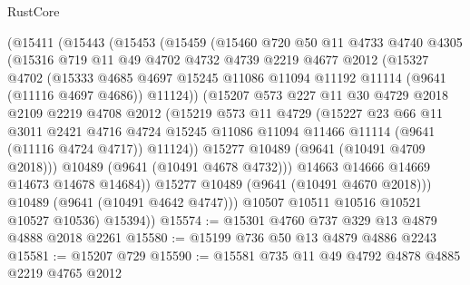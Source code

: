 \begin{lexlean}{RustCore}
\begin{coremodule}
        (@15411
          (@15443
            (@15453
              (@15459
                (@15460
                  @720
                  @50
                  @11
                  @4733
                  @4740
                  @4305
                  (@15316
                    @719
                    @11
                    @49
                    @4702
                    @4732
                    @4739
                    @2219
                    @4677
                    @2012
                    (@15327
                      @4702
                      (@15333
                        @4685
                        @4697
                        @15245
                        @11086
                        @11094
                        @11192
                        @11114
                        (@9641 (@11116 @4697 @4686))
                        @11124))
                    (@15207
                      @573
                      @227
                      @11
                      @30
                      @4729
                      @2018
                      @2109
                      @2219
                      @4708
                      @2012
                      (@15219
                        @573
                        @11
                        @4729
                        (@15227
                          @23
                          @66
                          @11
                          @3011
                          @2421
                          @4716
                          @4724
                          @15245
                          @11086
                          @11094
                          @11466
                          @11114
                          (@9641 (@11116 @4724 @4717))
                          @11124))
                      @15277
                      @10489
                      (@9641 (@10491 @4709 @2018)))
                    @10489
                    (@9641 (@10491 @4678 @4732)))
                  @14663
                  @14666
                  @14669
                  @14673
                  @14678
                  @14684))
              @15277
              @10489
              (@9641 (@10491 @4670 @2018)))
            @10489
            (@9641 (@10491 @4642 @4747)))
          @10507
          @10511
          @10516
          @10521
          @10527
          @10536)
        @15394))
@15574 := @15301 @4760 @737 @329 @13 @4879 @4888 @2018 @2261
@15580 := @15199 @736 @50 @13 @4879 @4886 @2243
@15581 := @15207 @729
@15590 := @15581 @735 @11 @49 @4792 @4878 @4885 @2219 @4765 @2012

\end{coremodule}
\end{lexlean}
